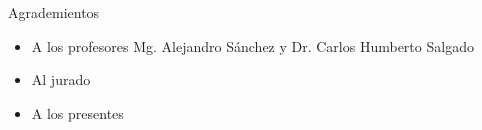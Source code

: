 \documentclass[10pt]{beamer}
\begin{document}
\begin{frame}{Agrademientos}
    \begin{itemize}
        \item A los profesores Mg. Alejandro Sánchez y Dr. Carlos Humberto Salgado
        \item Al jurado
        \item A los presentes
    \end{itemize}
\end{frame}

\end{document}
